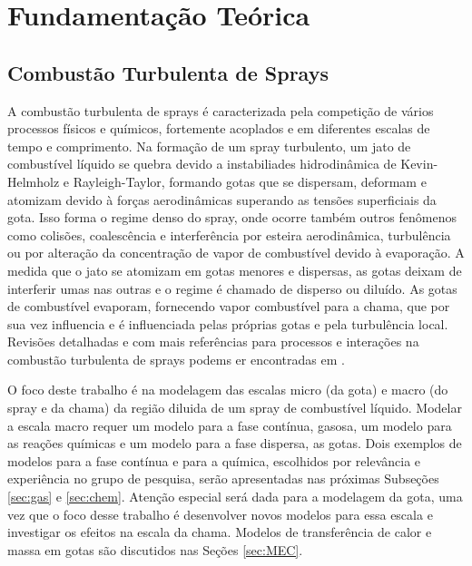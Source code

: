 \section{Fundamentação Teórica}



\subsection{Combustão Turbulenta de Sprays}

A combustão turbulenta de sprays é caracterizada pela competição de vários processos físicos e químicos, fortemente acoplados e em diferentes escalas de tempo e comprimento. 
Na formação de um spray turbulento, um jato de combustível líquido se quebra devido a instabiliades hidrodinâmica de Kevin-Helmholz e Rayleigh-Taylor, formando gotas que se dispersam, deformam e atomizam devido à forças aerodinâmicas superando as tensões superficiais da gota.
Isso forma o {regime denso} do spray, onde ocorre também outros fenômenos como colisões, coalescência e interferência por esteira aerodinâmica, turbulência ou por alteração da concentração de vapor de combustível devido à evaporação.
A medida que o jato se atomizam em gotas menores e dispersas, as gotas deixam de interferir umas nas outras e o regime é chamado de disperso ou diluído. 
As gotas de combustível evaporam, fornecendo vapor combustível para a chama, que por sua vez influencia e é influenciada pelas próprias gotas e pela turbulência local.
Revisões detalhadas e com mais referências para processos e interações na combustão turbulenta de sprays podems er encontradas em .


O foco deste trabalho é na modelagem das escalas micro (da gota) e macro (do spray e da chama) da região diluida de um spray de combustível líquido.
Modelar a escala macro requer um modelo para a fase contínua, gasosa, um modelo para as reações químicas e um modelo para a fase dispersa, as gotas.
Dois exemplos de modelos para a fase contínua e para a química, escolhidos por relevância e experiência no grupo de pesquisa, serão apresentadas nas próximas Subseções \ref{sec:gas} e \ref{sec:chem}.
Atenção especial será dada para a modelagem da gota, uma vez que o foco desse trabalho é desenvolver novos modelos para essa escala e investigar os efeitos na escala da chama.
Modelos de transferência de calor e massa em gotas são discutidos nas Seções \ref{sec:MEC}. 

